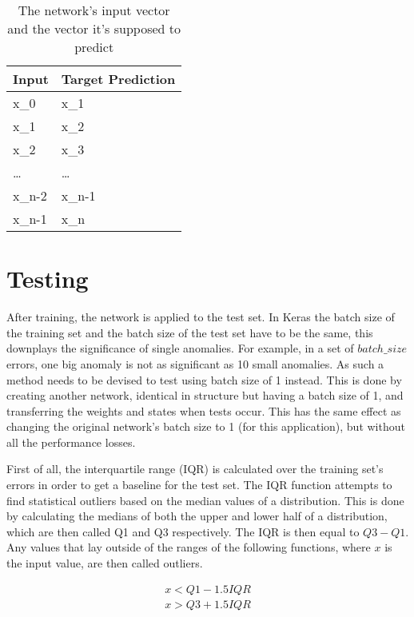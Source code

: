 \begin{table}[]
	\centering
	\caption{The network's input vector and the vector it's supposed to predict}\label{tab:training_set_shift}
	\begin{tabular}{ll}
		Input & Target Prediction \\ \hline
		x_0    & x_1                \\
		x_1    & x_2                \\
		x_2    & x_3                \\
		\dots   & \dots               \\
		x_{n-2}  & x_{n-1}              \\
		x_{n-1}  & x_n               
	\end{tabular}
\end{table}

\section{Testing}\label{sec:methods:testing}
After training, the network is applied to the test set. In Keras the batch size of the training set and the batch size of the test set have to be the same, this downplays the significance of single anomalies. For example, in a set of \(batch\_size\) errors, one big anomaly is not as significant as 10 small anomalies. As such a method needs to be devised to test using batch size of 1 instead. This is done by creating another network, identical in structure but having a batch size of 1, and transferring the weights and states when tests occur. This has the same effect as changing the original network's batch size to 1 (for this application), but without all the performance losses.

First of all, the interquartile range (IQR) is calculated over the training set's errors in order to get a baseline for the test set. The IQR function attempts to find statistical outliers based on the median values of a distribution. This is done by calculating the medians of both the upper and lower half of a distribution, which are then called Q1 and Q3 respectively. The IQR is then equal to \(Q3 - Q1\). Any values that lay outside of the ranges of the following functions, where \(x\) is the input value, are then called outliers.

\begin{subequations}
\begin{align}
	x < Q1 - 1.5 IQR \label{eq:iqr_min} \\
	x > Q3 + 1.5 IQR \label{eq:iqr_max}
\end{align}
\end{subequations}

